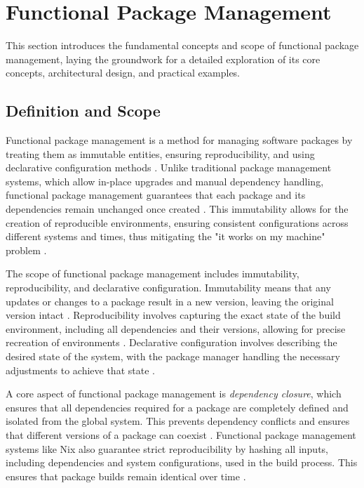 \section{Functional Package Management}

This section introduces the fundamental concepts and scope of functional package
management, laying the groundwork for a detailed exploration of its core concepts,
architectural design, and practical examples.

\subsection{Definition and Scope}

Functional package management is a method for managing software packages by treating
them as immutable entities, ensuring reproducibility, and using declarative configuration
methods \cite[Section 2.1]{courtesFunctionalPackageManagement2013}. Unlike traditional
package management systems, which allow in-place upgrades and manual dependency handling,
functional package management guarantees that each package and its dependencies remain
unchanged once created \cite[Section 2.2]{courtesFunctionalPackageManagement2013}.
This immutability allows for the creation of reproducible environments, ensuring
consistent configurations across different systems and times, thus mitigating the
"it works on my machine" problem \cite[Section 2, Page 5]{rahmanWorksMeCannot2022}.

The scope of functional package management includes immutability, reproducibility,
and declarative configuration. Immutability means that any updates or changes to a
package result in a new version, leaving the original version intact
\cite[Page 84]{dolstraNixSafePolicyFree2004}. Reproducibility involves capturing
the exact state of the build environment, including all dependencies and their
versions, allowing for precise recreation of environments
\cite[Section 2.1]{courtesFunctionalPackageManagement2013}. Declarative configuration
involves describing the desired state of the system, with the package manager handling
the necessary adjustments to achieve that state \cite[Section 2.1]{courtesFunctionalPackageManagement2013}.

A core aspect of functional package management is \textit{dependency closure}, which
ensures that all dependencies required for a package are completely defined and isolated
from the global system. This prevents dependency conflicts and ensures that different
versions of a package can coexist \cite[Chapter 3.3]{dolstraPurelyFunctionalSoftware2006}.
Functional package management systems like Nix also guarantee strict reproducibility by
hashing all inputs, including dependencies and system configurations, used in the build
process. This ensures that package builds remain identical over time
\cite[Section 2.2]{courtesFunctionalPackageManagement2013}.

